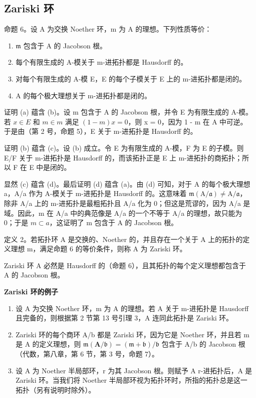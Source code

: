 \subsection{Zariski 环}

命题 6。设 A 为交换 Noether 环，m 为 A 的理想。下列性质等价：

\begin{enumerate}
\def\labelenumi{(\alph{enumi})}
\item
  \(\mathfrak{m}\) 包含于 A 的 Jacobson 根。
\item
  每个有限生成的 A-模关于 m-进拓扑都是 Hausdorff 的。
\item
  对每个有限生成的 A-模 E，E 的每个子模关于 E 上的 m-进拓扑都是闭的。
\item
  A 的每个极大理想关于 m-进拓扑都是闭的。
\end{enumerate}

证明 (a) 蕴含 (b)。设 m 包含于 A 的 Jacobson 根，并令 E 为有限生成的 A-模。若 \(x \in E\) 和 \(m \in m\) 满足 \((1 - m)x = 0\)，则 x = 0，因为 1 - m 在 A 中可逆。于是由（第 2 号，命题 5），E 关于 m-进拓扑是 Hausdorff 的。

证明 (b) 蕴含 (c)。设 (b) 成立。令 E 为有限生成的 A-模，F 为 E 的子模。则 E/F 关于 m-进拓扑是 Hausdorff 的，而该拓扑正是 E 上 m-进拓扑的商拓扑；所以 F 在 E 中是闭的。

显然 (c) 蕴含 (d)。最后证明 (d) 蕴含 (a)。由 (d) 可知，对于 A 的每个极大理想 a，A/a 作为 A-模关于 m-进拓扑是 Hausdorff 的。这意味着 \(\mathfrak{m}(\mathrm{A}/\mathfrak{a}) \neq \mathrm{A}/\mathfrak{a}\)，除非 A/a 上的 m-进拓扑是最粗拓扑且 A/a 化为 0；但这是荒谬的，因为 A/a 是域。因此，m 在 A/a 中的典范像是 A/a 的一个不等于 A/a 的理想，故只能为 0；于是 \(m \subset a\)，这证明了 m 包含于 A 的 Jacobson 根。

定义 2。若拓扑环 A 是交换的、Noether 的，并且存在一个关于 A 上的拓扑的定义理想 m，满足命题 6 的等价条件，则称 A 为 Zariski 环。

Zariski 环 A 必然是 Hausdorff 的（命题 6），且其拓扑的每个定义理想都包含于 A 的 Jacobson 根。

\textbf{Zariski 环的例子}\par

\begin{enumerate}
\def\labelenumi{(\arabic{enumi})}
\item
  设 A 为交换 Noether 环，m 为 A 的理想。若 A 关于 m-进拓扑是 Hausdorff 且完备的，则根据第 2 节第 13 号引理 3，A 连同此拓扑是 Zariski 环。
\item
  Zariski 环的每个商环 A/b 都是 Zariski 环，因为它是 Noether 环，并且若 m 是 A 的定义理想，则 \(\mathfrak{m}(\mathbf{A}/\mathfrak{b}) = (\mathfrak{m} + \mathfrak{b})/\mathfrak{b}\) 包含于 A/b 的 Jacobson 根（代数，第八章，第 6 节，第 3 号，命题 7）。
\item
  设 A 为 Noether 半局部环，r 为其 Jacobson 根。则赋予 A r-进拓扑后，A 是 Zariski 环。当我们将 Noether 半局部环视为拓扑环时，所指的拓扑总是这一拓扑（另有说明时除外）。
\end{enumerate}

